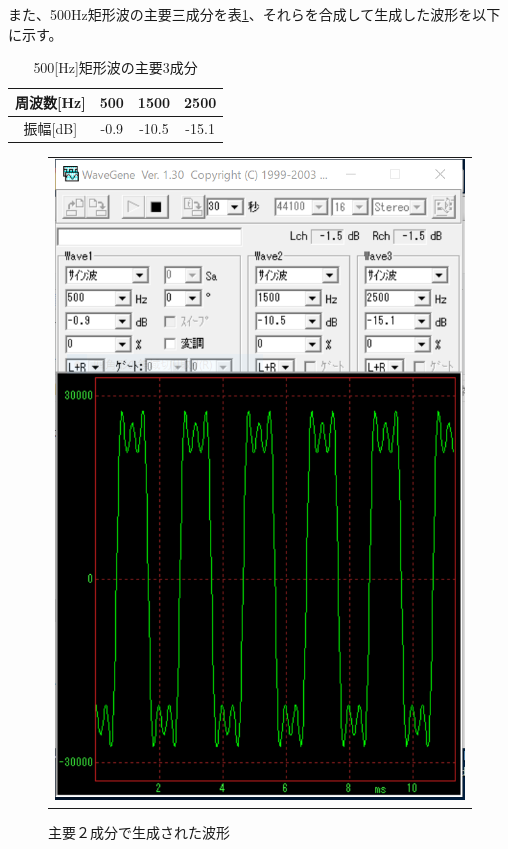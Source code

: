 \documentclass[uplatex, titlepage]{jsarticle}
\begin{document}
  また、500Hz矩形波の主要三成分を表\ref{table:500hz}、それらを合成して生成した波形を以下に示す。\\

\begin{table}[H]
  \centering
  \caption{500[Hz]矩形波の主要3成分}
  \label{table:500hz}
  \begin{tabular}{|c|c|c|c|} \hline
    周波数[Hz] & 500 & 1500 & 2500 \\ \hline
    振幅[dB] & -0.9 & -10.5 & -15.1 \\ \hline
  \end{tabular}

\end{table}


\begin{figure}[H]
    \begin{tabular}{c}

      \begin{minipage}{0.45\hsize}
        \begin{center}
          \includegraphics[scale=0.45]{./tuusin1.2/sqmake00.png}
          \caption{主要２成分で生成された波形}
          \label{fig:sqmake00}
        \end{center}
      \end{minipage}


\end{tabular}
\end{figure}
\end{document}
